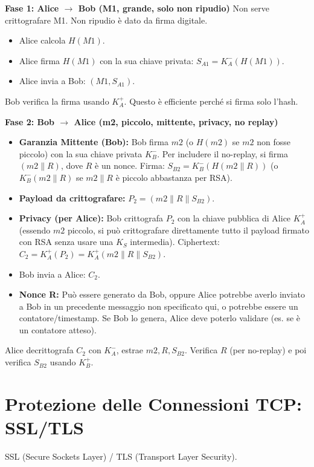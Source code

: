 \textbf{Fase 1: Alice $\rightarrow$ Bob (M1, grande, solo non ripudio)}
Non serve crittografare M1. Non ripudio è dato da firma digitale.
\begin{itemize}
    \item Alice calcola $H(M1)$.
    \item Alice firma $H(M1)$ con la sua chiave privata: $S_{A1} = K_A^-(H(M1))$.
    \item Alice invia a Bob: $(M1, S_{A1})$.
\end{itemize}
Bob verifica la firma usando $K_A^+$. Questo è efficiente perché si firma solo l'hash.

\textbf{Fase 2: Bob $\rightarrow$ Alice (m2, piccolo, mittente, privacy, no replay)}
\begin{itemize}
    \item \textbf{Garanzia Mittente (Bob):} Bob firma $m2$ (o $H(m2)$ se $m2$ non fosse piccolo) con la sua chiave privata $K_B^-$. Per includere il no-replay, si firma $(m2 \mathbin{\|} R)$, dove $R$ è un nonce. Firma: $S_{B2} = K_B^-(H(m2 \mathbin{\|} R))$ (o $K_B^-(m2 \mathbin{\|} R)$ se $m2 \mathbin{\|} R$ è piccolo abbastanza per RSA).
    \item \textbf{Payload da crittografare:} $P_2 = (m2 \mathbin{\|} R \mathbin{\|} S_{B2})$.
    \item \textbf{Privacy (per Alice):} Bob crittografa $P_2$ con la chiave pubblica di Alice $K_A^+$ (essendo $m2$ piccolo, si può crittografare direttamente tutto il payload firmato con RSA senza usare una $K_S$ intermedia).
    Ciphertext: $C_2 = K_A^+(P_2) = K_A^+(m2 \mathbin{\|} R \mathbin{\|} S_{B2})$.
    \item Bob invia a Alice: $C_2$.
    \item \textbf{Nonce R:} Può essere generato da Bob, oppure Alice potrebbe averlo inviato a Bob in un precedente messaggio non specificato qui, o potrebbe essere un contatore/timestamp. Se Bob lo genera, Alice deve poterlo validare (es. se è un contatore atteso).
\end{itemize}
Alice decrittografa $C_2$ con $K_A^-$, estrae $m2, R, S_{B2}$. Verifica $R$ (per no-replay) e poi verifica $S_{B2}$ usando $K_B^+$.

\section{Protezione delle Connessioni TCP: SSL/TLS}
\label{sec:ssl_tls}
SSL (Secure Sockets Layer) / TLS (Transport Layer Security).

